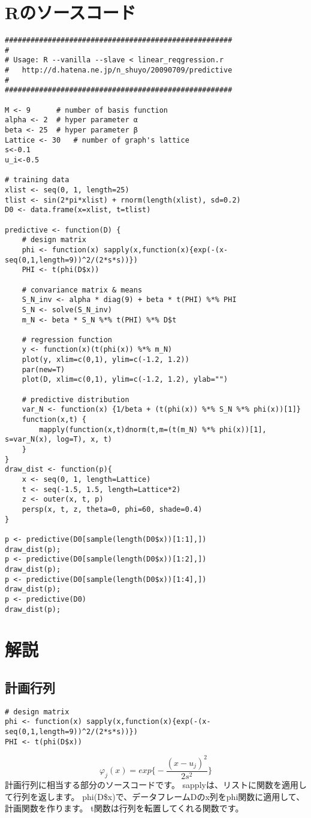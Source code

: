 \documentclass[uplatex]{jsarticle}
\begin{document}
\section{Rのソースコード}
\begin{lstlisting}[basicstyle=\ttfamily\footnotesize, frame=single]
#####################################################
#
# Usage: R --vanilla --slave < linear_reqgression.r
# 	http://d.hatena.ne.jp/n_shuyo/20090709/predictive
#
#####################################################

M <- 9		# number of basis function
alpha <- 2	# hyper parameter α
beta <- 25	# hyper parameter β
Lattice <- 30	# number of graph's lattice
s<-0.1
u_i<-0.5

# training data
xlist <- seq(0, 1, length=25)
tlist <- sin(2*pi*xlist) + rnorm(length(xlist), sd=0.2)
D0 <- data.frame(x=xlist, t=tlist)

predictive <- function(D) {
    # design matrix
    phi <- function(x) sapply(x,function(x){exp(-(x-seq(0,1,length=9))^2/(2*s*s))})
    PHI <- t(phi(D$x))

    # convariance matrix & means
    S_N_inv <- alpha * diag(9) + beta * t(PHI) %*% PHI
    S_N <- solve(S_N_inv)
    m_N <- beta * S_N %*% t(PHI) %*% D$t

    # regression function
    y <- function(x)(t(phi(x)) %*% m_N)
    plot(y, xlim=c(0,1), ylim=c(-1.2, 1.2))
    par(new=T)
    plot(D, xlim=c(0,1), ylim=c(-1.2, 1.2), ylab="")

    # predictive distribution
    var_N <- function(x) {1/beta + (t(phi(x)) %*% S_N %*% phi(x))[1]}
    function(x,t) {
        mapply(function(x,t)dnorm(t,m=(t(m_N) %*% phi(x))[1], s=var_N(x), log=T), x, t)
    }
}
draw_dist <- function(p){
    x <- seq(0, 1, length=Lattice)
    t <- seq(-1.5, 1.5, length=Lattice*2)
    z <- outer(x, t, p)
    persp(x, t, z, theta=0, phi=60, shade=0.4)
}

p <- predictive(D0[sample(length(D0$x))[1:1],])
draw_dist(p);
p <- predictive(D0[sample(length(D0$x))[1:2],])
draw_dist(p);
p <- predictive(D0[sample(length(D0$x))[1:4],])
draw_dist(p);
p <- predictive(D0)
draw_dist(p);
\end{lstlisting}

\section{解説}
\subsection{計画行列}
\begin{lstlisting}[basicstyle=\ttfamily\footnotesize, frame=single]
# design matrix
phi <- function(x) sapply(x,function(x){exp(-(x-seq(0,1,length=9))^2/(2*s*s))})
PHI <- t(phi(D$x))
\end{lstlisting}
\begin{equation}
φ_j(x)=exp\biggl\{-\frac{(x-u_j)^2}{2s^2}\biggl\}
\end{equation}
計画行列に相当する部分のソースコードです。
sapplyは、リストに関数を適用して行列を返します。
phi(D\$x)で、データフレームDのx列をphi関数に適用して、計画関数を作ります。
t関数は行列を転置してくれる関数です。
\end{document}

